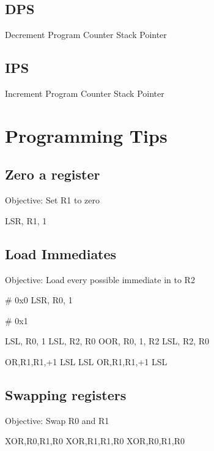 \documentclass[a4paper]{article}
\begin{document}
\subsection{DPS}
Decrement Program Counter Stack Pointer

\subsection{IPS}
Increment Program Counter Stack Pointer

\section{Programming Tips}

\subsection{Zero a register}

Objective: Set R1 to zero

LSR, R1, 1

\subsection{Load Immediates}

Objective: Load every possible immediate in to R2

# 0x0
LSR, R0, 1

# 0x1


LSL, R0, 1  
LSL, R2, R0
OOR, R0, 1, R2
LSL, R2, R0


OR,R1,R1,+1
LSL
LSL
OR,R1,R1,+1
LSL


\subsection{Swapping registers}

Objective: Swap R0 and R1

XOR,R0,R1,R0
XOR,R1,R1,R0
XOR,R0,R1,R0
\end{document}
